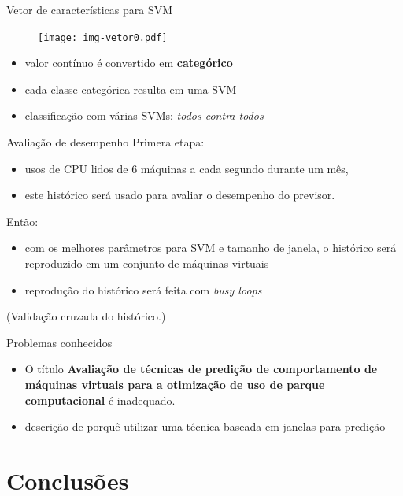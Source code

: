 \documentclass{beamer}
\begin{document}
\begin{frame}{Vetor de características para SVM}
\begin{figure}
\centering
\texttt{[image: img-vetor0.pdf]}
\end{figure}
\begin{itemize}
\item valor contínuo é convertido em \textbf{categórico}
\item cada classe categórica resulta em uma SVM
\item classificação com várias SVMs: \emph{todos-contra-todos}
\end{itemize}
\end{frame}

\begin{frame}{Avaliação de desempenho}
Primera etapa:
\begin{itemize}
\item usos de CPU lidos de 6 máquinas a cada segundo durante um mês,
\item este histórico será usado para avaliar o desempenho do previsor.
\end{itemize}
Então:
\begin{itemize}
\item com os melhores parâmetros para SVM e tamanho de janela, o histórico
será reproduzido em um conjunto de máquinas virtuais
\item reprodução do histórico será feita com \emph{busy loops}
\end{itemize}
\tiny{(Validação cruzada do histórico.)}
\end{frame}

\begin{frame}{Problemas conhecidos}
\begin{itemize}
  \item O título \textbf{Avaliação de técnicas de predição de comportamento
        de máquinas virtuais para a otimização de uso de parque computacional} é
        inadequado.
  \item descrição de porquê utilizar uma técnica baseada em janelas para
        predição
\end{itemize}
\end{frame}

\section{Conclusões}
\end{document}
